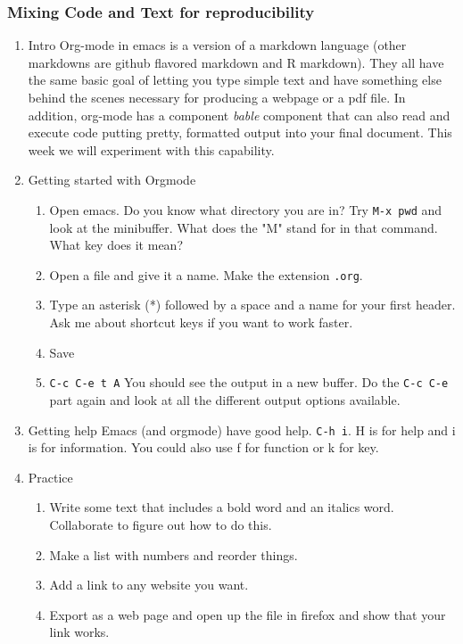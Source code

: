 \documentclass{article}
\begin{document}
\subsubsection{Mixing Code and Text for reproducibility}
\label{sec:orgfec1c80}
\begin{enumerate}
\item Intro
\label{sec:org6a048ad}
Org-mode in emacs is a version of a markdown language (other markdowns are github flavored markdown and R markdown). They all have the same basic goal of letting you type simple text and have something else behind the scenes necessary for producing a webpage or a pdf file. In addition, org-mode has a component \emph{bable} component that can also read and execute code putting pretty, formatted output into your final document. This week we will experiment with this capability.
\item Getting started with Orgmode
\label{sec:org291a974}
\begin{enumerate}
\item Open emacs. Do you know what directory you are in? Try \texttt{M-x pwd} and look at the minibuffer. What does the "M" stand for in that command. What key does it mean?
\item Open a file and give it a name. Make the extension \texttt{.org}.
\item Type an asterisk (*) followed by a space and a name for your first header.
Ask me about shortcut keys if you want to work faster.
\item Save
\item \texttt{C-c C-e t A} You should see the output in a new buffer. Do the \texttt{C-c C-e} part again and look at all the different output options available.
\end{enumerate}
\item Getting help
\label{sec:org675c8f1}
Emacs (and orgmode) have good help. \texttt{C-h i}. H is for help and i is for information. You could also use f for function or k for key. 
\item Practice
\label{sec:orgff90f60}
\begin{enumerate}
\item Write some text that includes a bold word and an italics word.
Collaborate to figure out how to do this.
\item Make a list with numbers and reorder things.
\item Add a link to any website you want.
\item Export as a web page and open up the file in firefox and show that your link works.

\end{enumerate}
\end{enumerate}
\end{document}
